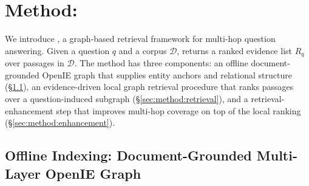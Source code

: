 %
%
%
%

\section{Method: \methodname{}}
\label{sec:method}

We introduce \methodname{}, a graph-based retrieval framework for multi-hop
question answering. Given a question $q$ and a corpus $\mathcal{D}$,
\methodname{} returns a ranked evidence list $R_q$ over passages in
$\mathcal{D}$. The method has three components: an offline
document-grounded OpenIE graph that supplies entity anchors and relational
structure (\S\ref{sec:method:substrate}), an evidence-driven local graph
retrieval procedure that ranks passages over a question-induced subgraph
(\S\ref{sec:method:retrieval}), and a retrieval-enhancement step that
improves multi-hop coverage on top of the local ranking
(\S\ref{sec:method:enhancement}).

\subsection{Offline Indexing: Document-Grounded Multi-Layer OpenIE Graph}
\label{sec:method:substrate}

